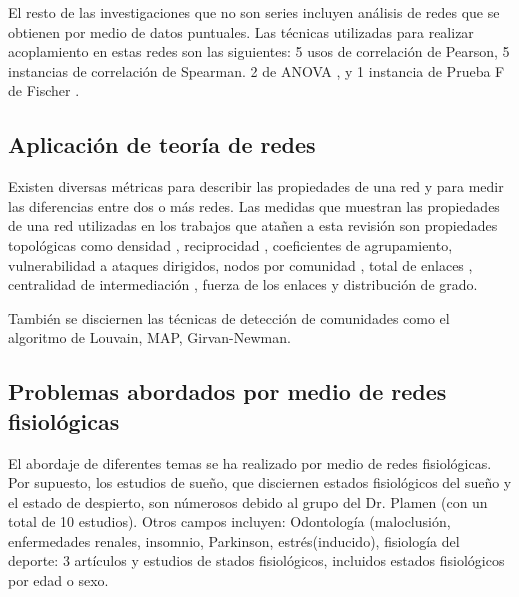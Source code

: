\documentclass[twoside,twocolumn]{article}
\begin{document}
El resto de las investigaciones que no son series incluyen análisis de redes que se obtienen por medio de datos puntuales.
Las técnicas utilizadas para realizar acoplamiento en estas redes son las siguientes:
5 usos de correlación de Pearson\cite{nakazato2020estimation}\cite{scala2014complex}\cite{chmiel2014spreading}\cite{pereira2018computational}\cite{tan2020organ},
5 instancias de correlación de Spearman\cite{barajas2020metabolic}\cite{barajas2021physiological}\cite{barajas2021sex}\cite{pereira2018computational}\cite{nakazato2020estimation}.
2 de ANOVA  \cite{zanetti2019information}\cite{rizzo2020network},
y 1 instancia de Prueba F de Fischer \cite{zanetti2019information}.

\subsection{Aplicación de teoría de redes}
Existen diversas métricas para describir las propiedades de una red y para medir las diferencias entre dos o más redes.
Las medidas que muestran las propiedades de una red utilizadas en los trabajos que atañen a esta revisión son
propiedades topológicas como densidad \cite{barajas2021sex}\cite{barajas2021physiological}, reciprocidad \cite{barajas2021sex}\cite{barajas2021physiological}, coeficientes de agrupamiento\cite{monti2018network}\cite{barajas2021sex}\cite{barajas2021physiological}, vulnerabilidad a ataques dirigidos\cite{barajas2021physiological}, nodos por comunidad \cite{chmiel2014spreading}, total de enlaces \cite{tan2020organ}\cite{bashan2012network}, centralidad de intermediación \cite{tan2020organ}, fuerza de los enlaces\cite{pereira2018computational}\cite{bartsch2014coexisting}\cite{bartsch2015network} y distribución de grado\cite{monti2018network}\cite{lin2020dynamic}.

También se disciernen las técnicas de detección de comunidades como el algoritmo de Louvain\cite{barajas2021sex}\cite{barajas2021physiological}, MAP\cite{barajas2020metabolic}, Girvan-Newman\cite{scala2014complex}.

\subsection{Problemas abordados por medio de redes fisiológicas}
El abordaje de diferentes temas se ha realizado por medio de redes fisiológicas. Por supuesto, los estudios de sueño, que disciernen estados fisiológicos del sueño y el estado de despierto, son númerosos debido al grupo del Dr. Plamen (con un total de 10 estudios).
Otros campos incluyen: Odontología (maloclusión\cite{scala2014complex}, enfermedades renales\cite{tan2020organ}, insomnio\cite{jansen2019network}, Parkinson\cite{monti2018network}, estrés(inducido)\cite{zanetti2019information}, fisiología del deporte: 3 artículos\cite{balague2020network}\cite{pereira2018computational}\cite{pereira2019complex} y estudios de stados fisiológicos, incluidos estados fisiológicos por edad\cite{chmiel2014spreading}\cite{barajas2020metabolic}\cite{lehnertz2020human}\cite{barajas2021physiological} o sexo\cite{barajas2021sex}.
\end{document}
